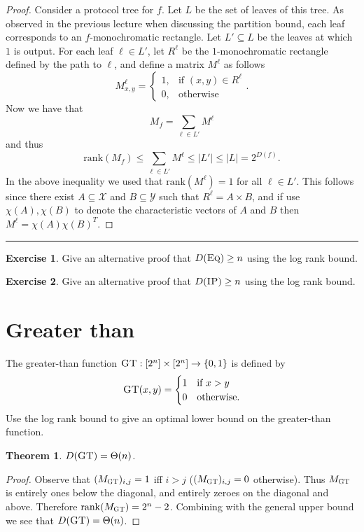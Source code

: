 \documentclass[11pt]{amsart}
\theoremstyle{plain}
\newtheorem{theorem}{Theorem}
\theoremstyle{definition}
\newtheorem{exercise}{Exercise}
\theoremstyle{plain}
\newcommand{\Eq}{\textsc{Eq}}
\newcommand{\GT}{\textsc{GT}}
\newcommand{\IP}{\textsc{IP}}
\newcommand{\rank}{\mathrm{rank}}
\newcommand{\exercises}{\bigskip \noindent\rule{8cm}{0.4pt} \medskip}
\begin{document}
\begin{proof}
Consider a protocol tree for $f$. Let $L$ be the set of leaves of this tree. As observed in the previous lecture when discussing the partition bound, each leaf corresponds to an $f$-monochromatic rectangle. Let $L'\subseteq L$ be the leaves at which $1$ is output. For each leaf $\ell \in L'$, let $R^\ell$ be the $1$-monochromatic rectangle defined by the path to $\ell$, and define a matrix $M^\ell$ as follows
$$M^\ell_{x,y} = \begin{cases}
1, &\text{if } (x,y) \in R^\ell \\
0, &\text{otherwise}
\end{cases}.$$
Now we have that
$$M_f = \sum_{\ell \in L'} M^\ell$$
and thus
$$\rank(M_f) \leq \sum_{\ell \in L'} M^\ell \leq |L'| \leq |L| = 2^{D(f)}.$$
In the above inequality we used that $\rank(M^\ell) = 1$ for all $\ell \in L'$. This follows since there exist $A \subseteq \mathcal{X}$ and $B \subseteq \mathcal{Y}$ such that $R^\ell = A\times B$, and if use $\chi(A), \chi(B)$ to denote the characteristic vectors of $A$ and $B$ then $M^\ell = \chi(A)\chi(B)^T$.
\end{proof}

\exercises

\begin{exercise} %
Give an alternative proof that $D(\Eq) \ge n$ using the log rank bound.
\end{exercise}

\begin{exercise}
Give an alternative proof that $D(\IP) \ge n$ using the log rank bound.\end{exercise}


\newpage \section{Greater than}

The greater-than function $\GT : [2^n] \times [2^n] \to \{0,1\}$ is defined by
\[
\GT(x,y) = \begin{cases}
1 & \mbox{if } x > y \\
0 & \mbox{otherwise.}
\end{cases}
\]
Use the log rank bound to give an optimal lower bound on the greater-than function.

\begin{theorem}
$D(\GT) = \Theta(n)$.
\end{theorem}

\begin{proof}
	Observe that $(M_\GT)_{i,j} = 1 $ iff $i >j$ ($(M_\GT)_{i,j} = 0$ otherwise). Thus $M_\GT$ is entirely ones below the diagonal, and entirely zeroes on the diagonal and above. Therefore $\rank(M_\GT) = 2^n-2$. Combining with the general upper bound we see that $D(\GT) = \Theta(n)$.
\end{proof}
\end{document}
